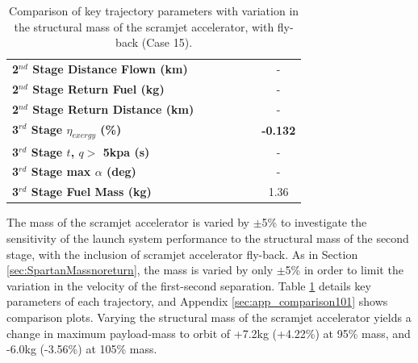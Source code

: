 \begin{table}[ht]
\begin{tabular}{l c c c c c c}
	\textbf{2$^{nd}$ Stage Distance Flown (km)}
	& \SecondDistmSPARTANNinetyFive
	& \SecondDistmSPARTANNinetySevenFive
	& \SecondDistmSPARTANStandard
	& \SecondDistmSPARTANOneHundredTwoFive
	& \SecondDistmSPARTANOneHundredFive
	& -
	\\
	\textbf{2$^{nd}$ Stage Return Fuel (kg)}
	& \returnFuelmSPARTANNinetyFive
	& \returnFuelmSPARTANNinetySevenFive
	& \returnFuelmSPARTANStandard
	& \returnFuelmSPARTANOneHundredTwoFive
	& \returnFuelmSPARTANOneHundredFive
	& -
	\\
	\textbf{2$^{nd}$ Stage Return Distance (km)}
	& \returnDistmSPARTANNinetyFive
	& \returnDistmSPARTANNinetySevenFive
	& \returnDistmSPARTANStandard
	& \returnDistmSPARTANOneHundredTwoFive
	& \returnDistmSPARTANOneHundredFive
	& -
	\\
	\hline 
	\textbf{3$^{rd}$ Stage $\eta_{exergy}$ (\%)}
	& \textbf{\thirddExergyEffmSPARTANNinetyFive}
	& \textbf{\thirddExergyEffmSPARTANNinetySevenFive}
	& \textbf{\thirddExergyEffmSPARTANStandard}
	& \textbf{\thirddExergyEffmSPARTANOneHundredTwoFive}
	& \textbf{\thirddExergyEffmSPARTANOneHundredFive}
	& \textbf{-0.132}
	\\
	\textbf{3$^{rd}$ Stage $t$, $q >$ 5kpa (s)}
	& \thirdqOverFivemSPARTANNinetyFive
	& \thirdqOverFivemSPARTANNinetySevenFive
	& \thirdqOverFivemSPARTANStandard
	& \thirdqOverFivemSPARTANOneHundredTwoFive
	& \thirdqOverFivemSPARTANOneHundredFive
	& -
	\\
	\textbf{3$^{rd}$ Stage max $\alpha$ (deg)}
	& \thirdmaxAoAmSPARTANNinetyFive
	& \thirdmaxAoAmSPARTANNinetySevenFive
	& \thirdmaxAoAmSPARTANStandard
	& \thirdmaxAoAmSPARTANOneHundredTwoFive
	& \thirdmaxAoAmSPARTANOneHundredFive
	& -
	\\
	\textbf{3$^{rd}$ Stage Fuel Mass (kg)}
	& \thirdmFuelmSPARTANNinetyFive
	& \thirdmFuelmSPARTANNinetySevenFive
	& \thirdmFuelmSPARTANStandard
	& \thirdmFuelmSPARTANOneHundredTwoFive
	& \thirdmFuelmSPARTANOneHundredFive
	&1.36
	\\
	\hline 
\end{tabular} 
\caption{Comparison of key trajectory parameters with variation in the structural mass of the scramjet accelerator, with fly-back (Case 15).}
\label{tab:comparison101}
\end{table}


The mass of the scramjet accelerator is varied by $\pm$5\% to investigate the sensitivity of the launch system performance to the structural mass of the second stage, with the inclusion of scramjet accelerator fly-back. As in Section \ref{sec:SpartanMassnoreturn}, the mass is varied by only $\pm$5\% in order to limit the variation in the velocity of the first-second separation.
Table \ref{tab:comparison101} details key parameters of each trajectory, and Appendix \ref{sec:app_comparison101} shows comparison plots.
Varying the structural mass of the scramjet accelerator yields a change in maximum payload-mass to orbit of +7.2kg (+4.22\%) at 95\% mass, and -6.0kg (-3.56\%) at 105\% mass. 

